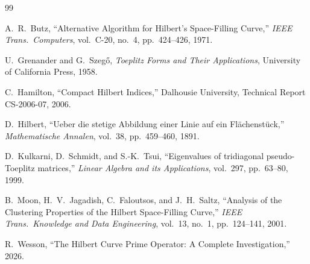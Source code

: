 \documentclass[11pt,a4paper]{article}
\begin{document}
\begin{thebibliography}{99}

A.~R.~Butz, ``Alternative Algorithm for Hilbert's Space-Filling Curve,''
\emph{IEEE Trans.\ Computers}, vol.~C-20, no.~4, pp.~424--426, 1971.

U.~Grenander and G.~Szeg\H{o}, \emph{Toeplitz Forms and Their
Applications}, University of California Press, 1958.

C.~Hamilton, ``Compact Hilbert Indices,'' Dalhousie University, Technical
Report CS-2006-07, 2006.

D.~Hilbert, ``Ueber die stetige Abbildung einer Linie auf ein
Fl\"{a}chenst\"{u}ck,'' \emph{Mathematische Annalen}, vol.~38, pp.~459--460,
1891.

D.~Kulkarni, D.~Schmidt, and S.-K.~Tsui, ``Eigenvalues of tridiagonal
pseudo-Toeplitz matrices,'' \emph{Linear Algebra and its Applications},
vol.~297, pp.~63--80, 1999.

B.~Moon, H.~V.~Jagadish, C.~Faloutsos, and J.~H.~Saltz, ``Analysis of the
Clustering Properties of the Hilbert Space-Filling Curve,'' \emph{IEEE
Trans.\ Knowledge and Data Engineering}, vol.~13, no.~1, pp.~124--141,
2001.

R.~Wesson, ``The Hilbert Curve Prime Operator: A Complete Investigation,''
2026.

\end{thebibliography}
\end{document}
